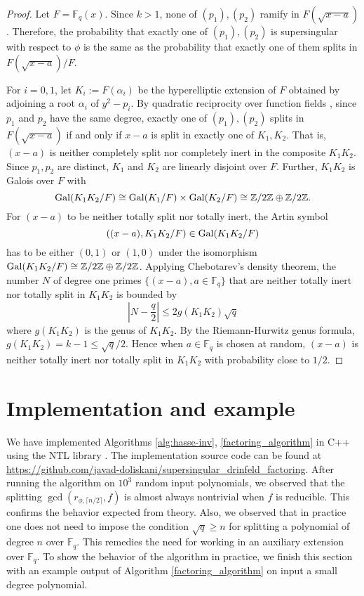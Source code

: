 \documentclass[12pt]{article}
\theoremstyle{plain}
\theoremstyle{definition}
\DeclareMathOperator{\gal}{{\rm Gal}} %
\def\Z{\ensuremath{\mathbb{Z}}}
\def\F{\ensuremath{\mathbb{F}}}
\begin{document}
\begin{proof}
	Let $F = \F_q(x)$. Since $k > 1$, none of $(p_1), (p_2)$ ramify in $F(\sqrt{x-a})$. Therefore, 
	the probability that exactly one of $(p_1), (p_2)$ is supersingular with respect to $\phi$ is 
	the same as the probability that exactly one of them splits in $F(\sqrt{x-a})/F$.
	
	For $i = 0, 1$, let $K_i:=F(\alpha_i)$ be the hyperelliptic extension of $F$ obtained by 
	adjoining a root $\alpha_i$ of $y^2-p_i$. By quadratic reciprocity over function fields 
	\cite{carlitz1932}, since $p_1$ and $p_2$ have the same degree, exactly one of $(p_1), (p_2)$ 
	splits in $F(\sqrt{x-a})$ if and only if $x-a$ is split in exactly one of $K_1, K_2$. That is, 
	$(x-a)$ is neither completely split nor completely inert in the composite $K_1K_2$. Since $p_1, 
	p_2$ are distinct, $K_1$ and $K_2$ are linearly disjoint over $F$. Further, $K_1K_2$ is Galois 
	over $F$ with 
	\[ \gal(K_1K_2/F) \cong \gal(K_1/F) \times \gal(K_2/F) \cong \Z/2\Z \oplus 
	\Z/2\Z. \]  
	For $(x-a)$ to be neither totally split nor totally inert, the Artin symbol 
	\[ ((x-a), K_1K_2/F) \in \gal(K_1K_2/F) \]
	has to be either $(0,1)$ or $(1,0)$ under the isomorphism $\gal(K_1K_2/F) \cong \Z/2\Z \oplus 
	\Z/2\Z$. Applying Chebotarev's density theorem, the number $N$ of degree one primes $\{(x-a), a 
	\in \F_q\}$ that are neither totally inert nor totally split in $K_1K_2$ is bounded by 
	\[ \left|N - \frac{q}{2} \right| \le 2 g(K_1K_2)\sqrt{q} \]
	where $g(K_1K_2)$ is the genus of $K_1K_2$. By the Riemann-Hurwitz genus formula, $g(K_1K_2) = 
	k-1 \le \sqrt{q}/2$. Hence when $a \in \F_q$ is chosen at random, $(x-a)$ is neither totally 
	inert nor totally split in $K_1K_2$ with probability close to $1/2$. 
\end{proof}






\section{Implementation and example}
\label{sec:impl}

We have implemented Algorithms \ref{alg:hasse-inv}, \ref{factoring_algorithm} in C++ using the NTL 
library \cite{shoup2001ntl}. The implementation source code can be found at 
\url{https://github.com/javad-doliskani/supersingular_drinfeld_factoring}. After running the 
algorithm on $10^3$ random input polynomials, we observed that the splitting $\gcd(r_{\phi, \lceil 
n / 2 \rceil}, f)$ is almost always nontrivial when $f$ is reducible. This confirms the behavior 
expected from theory. Also, we observed that in practice one does not need to impose the condition 
$\sqrt{q} \ge n$ for splitting a polynomial of degree $n$ over $\F_q$. This remedies the need for 
working in an auxiliary extension over $\F_q$. To show the behavior of the algorithm in practice, 
we finish this section with an example output of Algorithm \ref{factoring_algorithm} on input a 
small degree polynomial.
\end{document}
